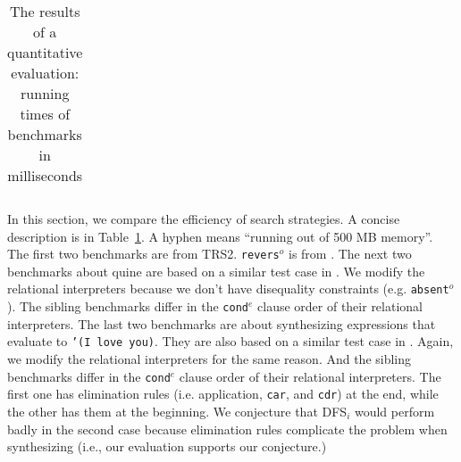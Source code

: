 \documentclass[format=acmlarge, review=true, authordraft=true]{acmart}
\newcommand{\conde}{\texttt{cond$^e$}}
\newcommand{\reverso}{\texttt{revers$^o$}}
\newcommand{\DFSi }[0]{DFS$_{i}$}
\begin{document}
\begin{table}
\begin{tabular}{|c|c|c|c|c|c|c|}
	\end{tabular}
	\caption{The results of a quantitative evaluation: running times of 
	benchmarks in milliseconds}
	\label{compare-efficiency}
\end{table}

In this section, we compare the efficiency of search strategies. A concise 
description is in Table~\ref{compare-efficiency}. A hyphen means ``running out
of 500 MB memory''. The first two benchmarks are from 
TRS2. \reverso{} is from 
\citet{rozplokhas2018improving}. 
The next two benchmarks about quine are based on a similar test case in 
\citet{byrd2017unified}. We modify the relational interpreters because we don't 
have disequality constraints (e.g. \texttt{absent$^o$}). The sibling 
benchmarks differ in the \conde{} clause order of their relational 
interpreters.
The last two benchmarks are about synthesizing expressions that 
evaluate to \texttt{'(I love you)}. 
They are also based on a similar test case in \mbox{\citet{byrd2017unified}}. 
Again, 
we modify the relational interpreters for the same reason. And the sibling 
benchmarks differ in the \conde{} clause order of their relational 
interpreters. The first one has elimination rules (i.e. application, 
\texttt{car}, and \texttt{cdr}) at the end, while the other has them at the 
beginning. We conjecture that \DFSi{} would perform badly in the second case 
because elimination rules complicate the problem when synthesizing (i.e., our 
evaluation supports our conjecture.)
\end{document}

